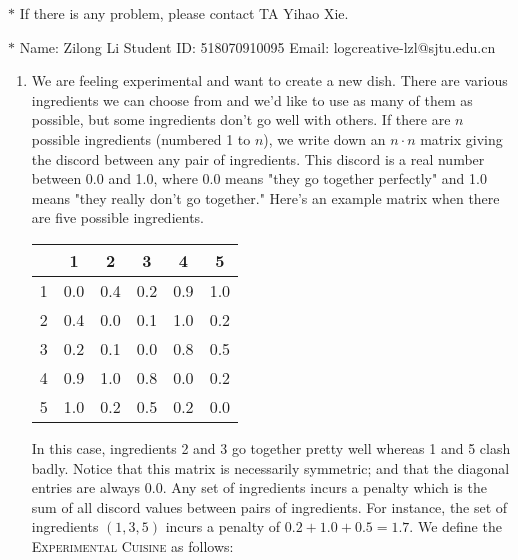 \documentclass[12pt,a4paper]{article}
\theoremstyle{definition}
\begin{document}
\noindent

\noindent{}
\begin{center}
\footnotesize{\color{red}$*$ If there is any problem, please contact TA Yihao Xie. }

\footnotesize{\color{blue}$*$ Name: Zilong Li \quad Student ID: 518070910095 \quad Email: logcreative-lzl@sjtu.edu.cn}
\end{center}

\begin{enumerate}
    \item We are feeling experimental and want to create a new dish. There are various ingredients we can choose from and we'd like to use as many of them as possible, but some ingredients don't go well with others. If there are $n$ possible ingredients (numbered 1 to $n$), we write down an $n\cdot n$ matrix giving the discord between any pair of ingredients. This discord is a real number between 0.0 and 1.0, where 0.0 means "they go together perfectly" and 1.0 means "they really don't go together." Here's an example matrix when there are five possible ingredients.
    \begin{center}
        \begin{tabular}{|c|ccccc|}
        \hline
             & 1  & 2 & 3 & 4 & 5\\
        \hline
            1 & 0.0 & 0.4 & 0.2 & 0.9 & 1.0\\
            2 & 0.4 & 0.0 & 0.1 & 1.0 & 0.2\\
            3 & 0.2 & 0.1 & 0.0 & 0.8 & 0.5\\
            4 & 0.9 & 1.0 & 0.8 & 0.0 & 0.2\\
            5 & 1.0 & 0.2 & 0.5 & 0.2 & 0.0\\
        \hline
        \end{tabular}
    \end{center}
    In this case, ingredients 2 and 3 go together pretty well whereas 1 and 5 clash badly. Notice that this matrix is necessarily symmetric; and that the diagonal entries are always 0.0. Any set of ingredients incurs a penalty which is the sum of all discord values between pairs of ingredients. For instance, the set of ingredients $(1,3,5)$ incurs a penalty of $0.2+1.0+0.5 = 1.7$. We define the \textsc{Experimental Cuisine} as follows:


\end{enumerate}
\end{document}

